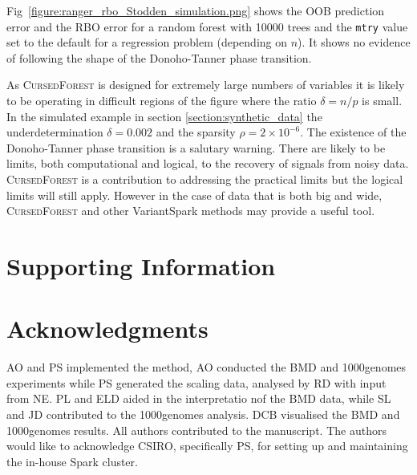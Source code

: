 \documentclass[10pt,letterpaper]{article}
\newcommand{\cursedforest}{\textsc{CursedForest}\xspace}
\newcommand{\mtry}{\texttt{mtry}\xspace}
\begin{document}
Fig~\ref{figure:ranger_rbo_Stodden_simulation.png} shows the OOB prediction error and the RBO error for a random forest with 10000 trees and the \mtry value set
to the default for a regression problem (depending on $n$). It shows no evidence of following the shape of the
Donoho-Tanner phase transition.

As \cursedforest is designed for extremely large numbers of variables it is likely to be operating in difficult regions
of the figure where the ratio $\delta = n/p$ is small. In the simulated example in section \ref{section:synthetic_data}
the underdetermination $\delta = 0.002$ and the sparsity $\rho =2\times 10^{-6}.$ The existence of the Donoho-Tanner
phase transition is a salutary warning. There are likely to be limits, both computational and logical, to the recovery
of signals from noisy data. \cursedforest is a contribution to addressing the practical limits but the logical limits
will still apply. However in the case of data that is both big and wide, \cursedforest and other VariantSpark methods
may provide a useful tool.


\clearpage
\section{Supporting Information}



\section*{Acknowledgments}
AO and PS implemented the method, AO conducted the BMD and 1000genomes experiments while PS generated the scaling data,
analysed by RD with input from NE. PL and ELD aided in the interpretatio nof the BMD data, while SL and JD contributed
to the 1000genomes analysis. DCB visualised the BMD and 1000genomes results. All authors contributed to the manuscript.
The authors would like to acknowledge CSIRO, specifically PS, for setting up and maintaining the in-house Spark cluster.

\nolinenumbers


\end{document}
